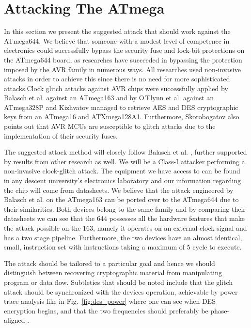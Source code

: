 \section{Attacking The ATmega}
\label{sec:attacking_mega}

In this section we present the suggested attack that should work against the ATmega644. We believe that someone with a modest level of competence in electronics could successfully bypass the security fuse and lock-bit protections on the ATmega644 board, as researches have succeeded in bypassing the protection imposed by the AVR family in numerous ways. All researches used non-invasive attacks in order to achieve this since there is no need for more sophisticated attacks.Clock glitch attacks against AVR chips were successfully applied by Balasch et al. \citep{glitches_paper} against an ATmega163 and by O'Flynn et al. \citep{chipwhisperer} against an ATmega328P and Kizhvatov \citep{avr_mega} managed to retrieve AES and DES cryptographic keys from an ATmega16 and ATXmega128A1. Furthermore, Skorobogatov \citep{sergei:thesis} also points out that AVR MCUs are susceptible to glitch attacks due to the implementation of their security fuses. 

The suggested attack method will closely follow Balasch et al. \citep{glitches_paper}, further supported by results from other research as well. We will be a Class-I attacker performing a non-invasive clock-glitch attack. The equipment we have access to can be found in any descent university's electronics laboratory and our information regarding the chip will come from datasheets. We believe that the attack engineered by Balasch et al. \citep{glitches_paper} on the ATmega163 can be ported over to the ATmega644 due to their similarities. Both devices belong to the same family and by comparing their datasheets we can see that the 644 possesses all the hardware features that make the attack possible on the 163, namely it operates on an external clock signal and has a two stage pipeline\citep{glitches_paper}. Furthermore, the two devices have an almost identical, small, instruction set with instructions taking a maximum of 5 cycle to execute.

The attack should be tailored to a particular goal and hence we should distinguish between recovering cryptographic material from manipulating program or data flow. Subtleties that should be noted include that the glitch attack should be synchronized with the devices operation, achievable by power trace analysis like in  Fig.~\ref{fig:des_power} where one can see when DES encryption begins, and that the two frequencies should preferably be phase-aligned \citep{glitches_paper}\citep{sergei:thesis}\citep{avr_mega}. 

